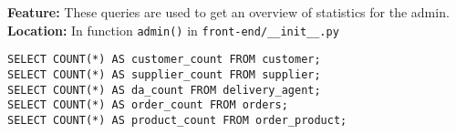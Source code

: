 \textbf{Feature:} These queries are used to get an overview of statistics for the admin. \\
\textbf{Location:} In function \texttt{admin()} in \texttt{front-end/\_\_init\_\_.py}

\begin{lstlisting}
SELECT COUNT(*) AS customer_count FROM customer;
SELECT COUNT(*) AS supplier_count FROM supplier;
SELECT COUNT(*) AS da_count FROM delivery_agent;
SELECT COUNT(*) AS order_count FROM orders;
SELECT COUNT(*) AS product_count FROM order_product;
\end{lstlisting}